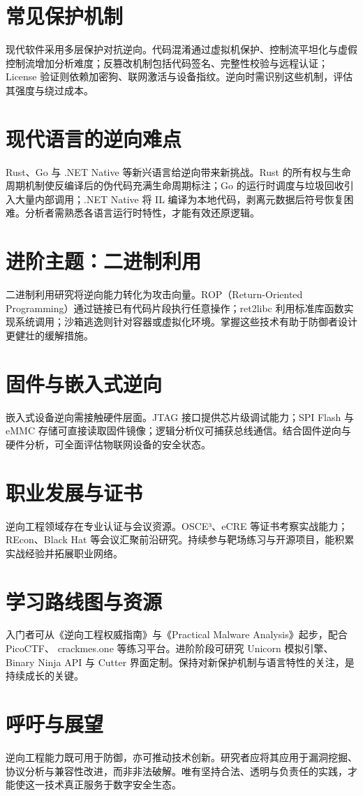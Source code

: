 \chapter{常见保护机制}
现代软件采用多层保护对抗逆向。代码混淆通过虚拟机保护、控制流平坦化与虚假控制流增加分析难度；反篡改机制包括代码签名、完整性校验与远程认证；License 验证则依赖加密狗、联网激活与设备指纹。逆向时需识别这些机制，评估其强度与绕过成本。\par
\chapter{现代语言的逆向难点}
Rust、Go 与 .NET Native 等新兴语言给逆向带来新挑战。Rust 的所有权与生命周期机制使反编译后的伪代码充满生命周期标注；Go 的运行时调度与垃圾回收引入大量内部调用；.NET Native 将 IL 编译为本地代码，剥离元数据后符号恢复困难。分析者需熟悉各语言运行时特性，才能有效还原逻辑。\par
\chapter{进阶主题：二进制利用}
二进制利用研究将逆向能力转化为攻击向量。ROP（Return-Oriented Programming）通过链接已有代码片段执行任意操作；ret2libc 利用标准库函数实现系统调用；沙箱逃逸则针对容器或虚拟化环境。掌握这些技术有助于防御者设计更健壮的缓解措施。\par
\chapter{固件与嵌入式逆向}
嵌入式设备逆向需接触硬件层面。JTAG 接口提供芯片级调试能力；SPI Flash 与 eMMC 存储可直接读取固件镜像；逻辑分析仪可捕获总线通信。结合固件逆向与硬件分析，可全面评估物联网设备的安全状态。\par
\chapter{职业发展与证书}
逆向工程领域存在专业认证与会议资源。OSCE³、eCRE 等证书考察实战能力；REcon、Black Hat 等会议汇聚前沿研究。持续参与靶场练习与开源项目，能积累实战经验并拓展职业网络。\par
\chapter{学习路线图与资源}
入门者可从《逆向工程权威指南》与《Practical Malware Analysis》起步，配合 PicoCTF、 crackmes.one 等练习平台。进阶阶段可研究 Unicorn 模拟引擎、Binary Ninja API 与 Cutter 界面定制。保持对新保护机制与语言特性的关注，是持续成长的关键。\par
\chapter{呼吁与展望}
逆向工程能力既可用于防御，亦可推动技术创新。研究者应将其应用于漏洞挖掘、协议分析与兼容性改进，而非非法破解。唯有坚持合法、透明与负责任的实践，才能使这一技术真正服务于数字安全生态。\par
